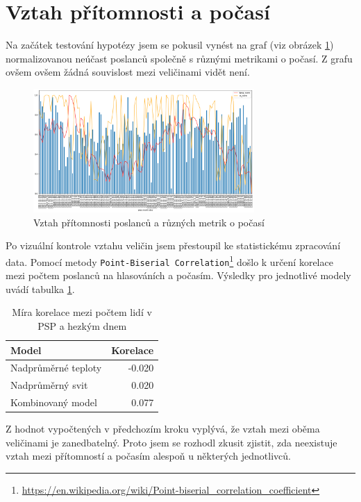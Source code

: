 \documentclass[12pt]{report}
\begin{document}
\section{Vztah přítomnosti a počasí}

Na začátek testování hypotézy jsem se pokusil vynést na graf (viz obrázek \ref{fig:weather_att}) normalizovanou neúčast poslanců společně s různými metrikami o počasí. Z grafu ovšem ovšem žádná souvislost mezi veličinami vidět není.

\begin{figure}
    \centering
    \includegraphics[width=0.75\textwidth]{weather_att.png}
    \caption{Vztah přítomnosti poslanců a různých metrik o počasí}
    \label{fig:weather_att}
\end{figure}

Po vizuální kontrole vztahu veličin jsem přestoupil ke statistickému zpracování data. Pomocí metody \texttt{Point-Biserial Correlation}\footnote{\url{https://en.wikipedia.org/wiki/Point-biserial_correlation_coefficient}} došlo k určení korelace mezi počtem poslanců na hlasováních a počasím. Výsledky pro jednotlivé modely uvádí tabulka \ref{tbl:pm_pd}.

\begin{table}[h!]
    \centering
    \begin{tabular}{lr}
        \hline 
        \textbf{Model} & \textbf{Korelace} \\
        \hline
        Nadprůměrné teploty & -0.020 \\
        Nadprůměrný svit & 0.020 \\
        Kombinovaný model & 0.077
    \end{tabular}
    \caption{Míra korelace mezi počtem lidí v PSP a hezkým dnem}
    \label{tbl:pm_pd}
\end{table}

Z hodnot vypočtených v předchozím kroku vyplývá, že vztah mezi oběma veličinami je zanedbatelný. Proto jsem se rozhodl zkusit zjistit, zda neexistuje vztah mezi přítomností a počasím alespoň u některých jednotlivců.
\end{document}

